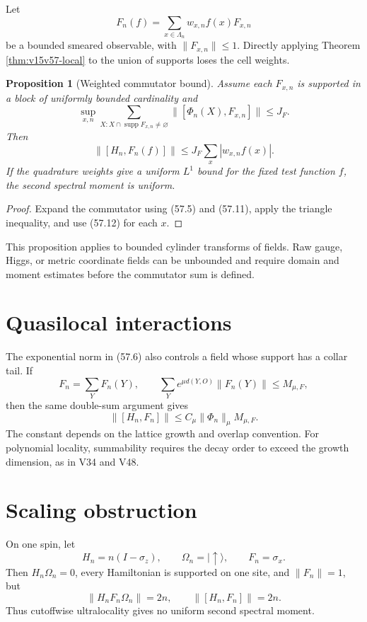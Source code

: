 \documentclass[11pt]{article}
\newtheorem{proposition}[theorem]{Proposition}
\theoremstyle{remark}
\begin{document}
Let
\[
 F_n(f)=\sum_{x\in\Lambda_n}w_{x,n}f(x)F_{x,n}          \tag{57.11}
\]
be a bounded smeared observable, with
\(\|F_{x,n}\|\leq1\).  Directly applying Theorem
\ref{thm:v15v57-local} to the union of supports loses the cell
weights.

\begin{proposition}[Weighted commutator bound]
\label{prop:v15v57-smeared}
Assume each \(F_{x,n}\) is supported in a block of uniformly bounded
cardinality and
\[
 \sup_{x,n}\sum_{X:X\cap\operatorname{supp}F_{x,n}\neq\varnothing}
 \|[\Phi_n(X),F_{x,n}]\|\leq J_F.                       \tag{57.12}
\]
Then
\[
 \boxed{
 \|[H_n,F_n(f)]\|
 \leq J_F\sum_x|w_{x,n}f(x)|.}                          \tag{57.13}
\]
If the quadrature weights give a uniform \(L^1\) bound for the
fixed test function \(f\), the second spectral moment is uniform.
\end{proposition}

\begin{proof}
Expand the commutator using (57.5) and (57.11), apply the triangle
inequality, and use (57.12) for each \(x\).
\end{proof}

This proposition applies to bounded cylinder transforms of fields.
Raw gauge, Higgs, or metric coordinate fields can be unbounded and
require domain and moment estimates before the commutator sum is
defined.

\section{Quasilocal interactions}

The exponential norm in (57.6) also controls a field whose support
has a collar tail.  If
\[
 F_n=\sum_YF_n(Y),\qquad
 \sum_Ye^{\mu d(Y,O)}\|F_n(Y)\|\leq M_{\mu,F},           \tag{57.14}
\]
then the same double-sum argument gives
\[
 \|[H_n,F_n]\|
 \leq C_\mu\|\Phi_n\|_\mu M_{\mu,F}.                    \tag{57.15}
\]
The constant depends on the lattice growth and overlap convention.
For polynomial locality, summability requires the decay order to
exceed the growth dimension, as in V34 and V48.

\section{Scaling obstruction}

\begin{countertheorem}
\label{cth:v15v57-scaling}
On one spin, let
\[
 H_n=n(I-\sigma_z),\qquad
 \Omega_n=|\!\uparrow\rangle,\qquad F_n=\sigma_x.       \tag{57.16}
\]
Then \(H_n\Omega_n=0\), every Hamiltonian is supported on one site,
and \(\|F_n\|=1\), but
\[
 \|H_nF_n\Omega_n\|=2n,\qquad
 \|[H_n,F_n]\|=2n.                                      \tag{57.17}
\]
Thus cutoffwise ultralocality gives no uniform second spectral
moment.
\end{countertheorem}
\end{document}
